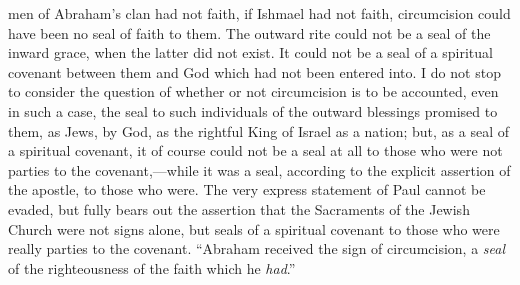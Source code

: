 \documentclass[]{book}
\begin{document}
men of Abraham's clan had not faith, if Ishmael had not faith, circumcision could have been no seal of faith to them. The outward rite could not be a seal of the inward grace, when the latter did not exist. It could not be a seal of a spiritual covenant between them and God which had not been entered into. I do not stop to consider the question of whether or not circumcision is to be accounted, even in such a case, the seal to such individuals of the outward blessings promised to them, as Jews, by God, as the rightful King of Israel as a nation; but, as a seal of a spiritual covenant, it of course could not be a seal at all to those who were not parties to the covenant,---while it was a seal, according to the explicit assertion of the apostle, to those who were. The very express statement of Paul cannot be evaded, but fully bears out the assertion that the Sacraments of the Jewish Church were not signs alone, but seals of a spiritual covenant to those who were really parties to the covenant. ``Abraham received the sign of circumcision, a \emph{seal} of the righteousness of the faith which he \emph{had}.''
\end{document}
